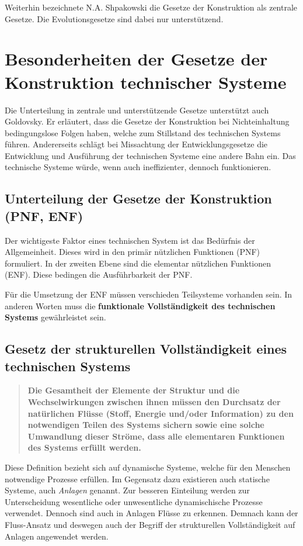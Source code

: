 \documentclass[11pt,a4paper]{article}
\begin{document}
Weiterhin bezeichnete N.A. Shpakowski die Gesetze der Konstruktion als
zentrale Gesetze.  Die Evolutionsgesetze sind dabei nur unterstützend.

\section{Besonderheiten der Gesetze der Konstruktion technischer Systeme}

Die Unterteilung in zentrale und unterstützende Gesetze unterstützt auch
Goldovsky.  Er erläutert, dass die Gesetze der Konstruktion bei
Nichteinhaltung bedingungslose Folgen haben, welche zum Stillstand des
technischen Systems führen.  Andererseits schlägt bei Missachtung der
Entwicklungsgesetze die Entwicklung und Ausführung der technischen Systeme
eine andere Bahn ein.  Das technische Systeme würde, wenn auch ineffizienter,
dennoch funktionieren.

\subsection{Unterteilung der Gesetze der Konstruktion (PNF, ENF)}

Der wichtigeste Faktor eines technischen System ist das Bedürfnis der
Allgemeinheit.  Dieses wird in den primär nützlichen Funktionen (PNF)
formuliert.  In der zweiten Ebene sind die elementar nützlichen Funktionen
(ENF).  Diese bedingen die Ausführbarkeit der PNF.

Für die Umsetzung der ENF müssen verschieden Teilsysteme vorhanden sein.  In
anderen Worten muss die \textbf{funktionale Vollständigkeit des technischen
  Systems} gewährleistet sein.

\subsection{Gesetz der strukturellen Vollständigkeit eines technischen
  Systems} 

\begin{quote}
\textbf{Die Gesamtheit der Elemente der Struktur und die Wechselwirkungen
  zwischen ihnen müssen den Durchsatz der natürlichen Flüsse (Stoff, Energie
  und/oder Information) zu den notwendigen Teilen des Systems sichern sowie
  eine solche Umwandlung dieser Ströme, dass alle elementaren Funktionen des
  Systems erfüllt werden.}
\end{quote}

Diese Definition bezieht sich auf dynamische Systeme, welche für den Menschen
notwendige Prozesse erfüllen.  Im Gegensatz dazu existieren auch statische
Systeme, auch \emph{Anlagen} genannt.  Zur besseren Einteilung werden zur
Unterscheidung wesentliche oder unwesentliche dynamischische Prozesse
verwendet.  Dennoch sind auch in Anlagen Flüsse zu erkennen.  Demnach kann der
Fluss-Ansatz und deswegen auch der Begriff der strukturellen Vollständigkeit
auf Anlagen angewendet werden.
\end{document}
